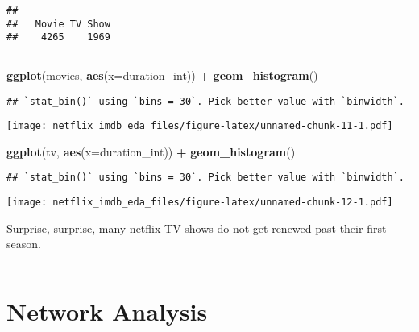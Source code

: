 \documentclass[]{article}
\newenvironment{Shaded}{\begin{snugshade}}{\end{snugshade}}
\newcommand{\DataTypeTok}[1]{\textcolor[rgb]{0.13,0.29,0.53}{#1}}
\newcommand{\KeywordTok}[1]{\textcolor[rgb]{0.13,0.29,0.53}{\textbf{#1}}}
\newcommand{\NormalTok}[1]{#1}
\newcommand{\OperatorTok}[1]{\textcolor[rgb]{0.81,0.36,0.00}{\textbf{#1}}}
\newcommand{\StringTok}[1]{\textcolor[rgb]{0.31,0.60,0.02}{#1}}
\begin{document}
\begin{verbatim}
## 
##   Movie TV Show 
##    4265    1969
\end{verbatim}

\begin{center}\rule{0.5\linewidth}{\linethickness}\end{center}

\begin{Shaded}
\end{Shaded}

\begin{Shaded}
\begin{Highlighting}[]
\KeywordTok{ggplot}\NormalTok{(movies, }\KeywordTok{aes}\NormalTok{(}\DataTypeTok{x=}\NormalTok{duration_int)) }\OperatorTok{+}\StringTok{ }\KeywordTok{geom_histogram}\NormalTok{()}
\end{Highlighting}
\end{Shaded}

\begin{verbatim}
## `stat_bin()` using `bins = 30`. Pick better value with `binwidth`.
\end{verbatim}

\texttt{[image: netflix\_imdb\_eda\_files/figure-latex/unnamed-chunk-11-1.pdf]}

\begin{Shaded}
\begin{Highlighting}[]
\KeywordTok{ggplot}\NormalTok{(tv, }\KeywordTok{aes}\NormalTok{(}\DataTypeTok{x=}\NormalTok{duration_int)) }\OperatorTok{+}\StringTok{ }\KeywordTok{geom_histogram}\NormalTok{()}
\end{Highlighting}
\end{Shaded}

\begin{verbatim}
## `stat_bin()` using `bins = 30`. Pick better value with `binwidth`.
\end{verbatim}

\texttt{[image: netflix\_imdb\_eda\_files/figure-latex/unnamed-chunk-12-1.pdf]}

Surprise, surprise, many netflix TV shows do not get renewed past their
first season.

\begin{center}\rule{0.5\linewidth}{\linethickness}\end{center}

\hypertarget{network-analysis}{%
\section{Network Analysis}\label{network-analysis}}
\end{document}
